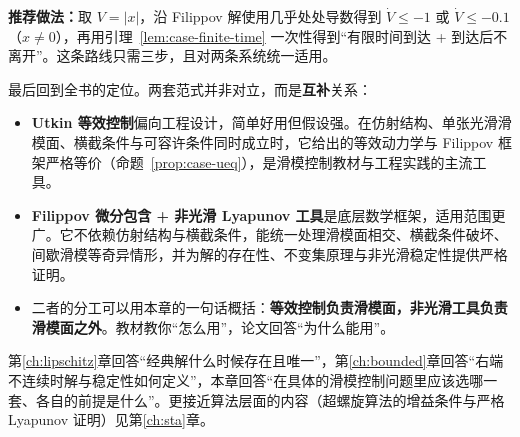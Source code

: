 \textbf{推荐做法：}取 $V=|x|$，沿 Filippov 解使用几乎处处导数得到 $\dot V\le-1$ 或 $\dot V\le-0.1$（$x\neq0$），再用引理~\ref{lem:case-finite-time} 一次性得到“有限时间到达 + 到达后不离开”。这条路线只需三步，且对两条系统统一适用。

最后回到全书的定位。两套范式并非对立，而是\textbf{互补}关系：

\begin{itemize}
  \item \textbf{Utkin 等效控制}偏向工程设计，简单好用但假设强。在仿射结构、单张光滑滑模面、横截条件与可容许条件同时成立时，它给出的等效动力学与 Filippov 框架严格等价（命题~\ref{prop:case-ueq}），是滑模控制教材与工程实践的主流工具。
  \item \textbf{Filippov 微分包含 + 非光滑 Lyapunov 工具}是底层数学框架，适用范围更广。它不依赖仿射结构与横截条件，能统一处理滑模面相交、横截条件破坏、间歇滑模等奇异情形，并为解的存在性、不变集原理与非光滑稳定性提供严格证明。
  \item 二者的分工可以用本章的一句话概括：\textbf{等效控制负责滑模面，非光滑工具负责滑模面之外}。教材教你“怎么用”，论文回答“为什么能用”。
\end{itemize}

第\ref{ch:lipschitz}章回答“经典解什么时候存在且唯一”，第\ref{ch:bounded}章回答“右端不连续时解与稳定性如何定义”，本章回答“在具体的滑模控制问题里应该选哪一套、各自的前提是什么”。更接近算法层面的内容（超螺旋算法的增益条件与严格 Lyapunov 证明）见第\ref{ch:sta}章。
